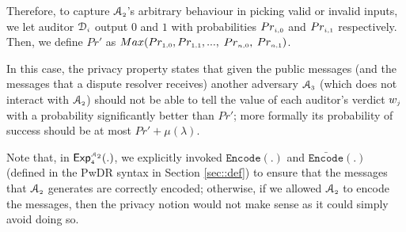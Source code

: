 Therefore, to capture $\mathcal{A}_{\scriptscriptstyle 2}$'s arbitrary behaviour in picking valid or invalid inputs, we let auditor $\mathcal{D}_{\scriptscriptstyle i}$ output $0$ and $1$ with probabilities $Pr_{\scriptscriptstyle i,0}$ and $Pr_{\scriptscriptstyle i,1}$ respectively. Then, we define $Pr'$ as  $Max(Pr_{\scriptscriptstyle 1,0},Pr_{\scriptscriptstyle 1,1}, ...,$ $ Pr_{\scriptscriptstyle n,0}, $ $Pr_{\scriptscriptstyle n,1} )$.  

In this case, the privacy property states that given the public messages (and the messages that a dispute resolver receives) another adversary $\mathcal{A}_{\scriptscriptstyle 3}$ (which does not interact with $\mathcal{A}_{\scriptscriptstyle 2}$) should not be able to tell the value of each auditor's verdict $w_{\scriptscriptstyle j}$ with a probability significantly better than $Pr'$; more formally its probability of success should be at most $Pr'+\mu(\lambda)$.

Note that, in $\mathsf{Exp}_{\scriptscriptstyle 4}^{\scriptscriptstyle\mathcal{A}_{\scriptscriptstyle 2}}(.)$, we explicitly invoked $\mathtt{Encode}(.)$ and ${\bar{ \mathtt{Encode}}}(.)$ (defined in the PwDR syntax in Section \ref{sec::def}) to ensure that the messages that $\mathcal{A}_{\scriptscriptstyle 2}$ generates are correctly encoded; otherwise, if we allowed  $\mathcal{A}_{\scriptscriptstyle 2}$ to encode the messages, then the privacy notion would not make sense as it could simply avoid doing so.




%
